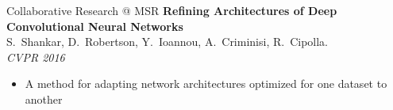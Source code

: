 \documentclass[t,xcolor=dvipsnames]{beamer}
\begin{document}

\begin{frame}{Collaborative Research @ MSR}
\textbf{Refining Architectures of Deep Convolutional Neural Networks}\\{\footnotesize S.\ Shankar, D.\ Robertson, Y.\ Ioannou, A.\ Criminisi, R.\ Cipolla.\\\textit{CVPR 2016}}
\begin{itemize}
    \item A method for adapting network architectures optimized for one dataset to another
\end{itemize}
\end{frame}

\usebackgroundtemplate{}
\end{document}
